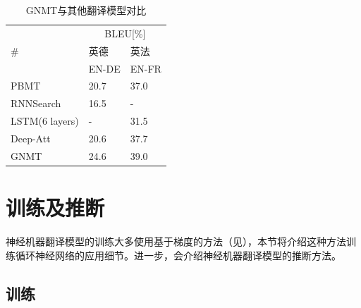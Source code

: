 \begin{table}[htp]
\centering
\caption{GNMT与其他翻译模型对比}
\label{tab:10-8}
\begin{tabular}{l l l}
\multicolumn{1}{l|}{\multirow{3}{*}{\#}} & \multicolumn{2}{c}{BLEU[\%]} \\
\multicolumn{1}{l|}{}                    & 英德  & 英法                                               \\
\multicolumn{1}{l|}{}                    & EN-DE  & EN-FR                                               \\ \hline
\multicolumn{1}{l|}{PBMT}                & 20.7            & 37.0            \\
\multicolumn{1}{l|}{RNNSearch}           & 16.5            & -               \\
\multicolumn{1}{l|}{LSTM(6 layers)}      & -               & 31.5            \\
\multicolumn{1}{l|}{Deep-Att}            & 20.6            & 37.7            \\
\multicolumn{1}{l|}{GNMT}                & 24.6            & 39.0            \\
\end{tabular}
\end{table}

\sectionnewpage
\vspace{-3em}
\section{训练及推断}

神经机器翻译模型的训练大多使用基于梯度的方法（见{\chapternine}），本节将介绍这种方法训练循环神经网络的应用细节。进一步，会介绍神经机器翻译模型的推断方法。

\vspace{-1em}
\subsection{训练}

